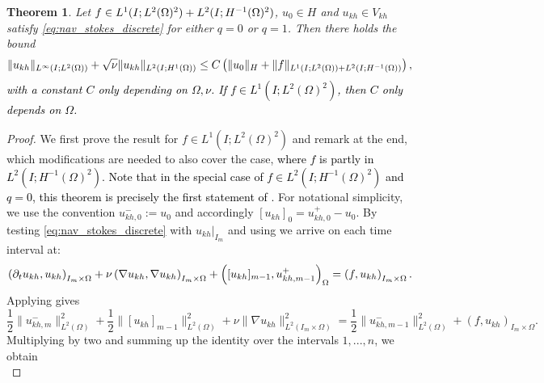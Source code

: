 \documentclass{m2an}
\newcommand\blue[1]{\textcolor{black}{#1}}
\newtheorem{theorem}{Theorem}[section]
\newcommand{\ImOprod}[1]{\left( #1 \right)_{I_m\times\Omega}}
\newcommand{\Oprod}[1]{\left( #1 \right)_{\Omega}}
\newcommand{\Vkh}{V_{kh}}
\newcommand{\ukh}{u_{kh}}
\newcommand{\HmOd}{H^{-1}(\Omega)^2}
\newcommand{\LtwoHone}{L^2(I;H^1(\Omega))}
\newcommand{\LtwomLtwo}{L^2(I_m \times \Omega)}
\begin{document}
\begin{theorem}\label{thm:stability_discrete_navier_stokes}
  Let $f \in L^1(I;L^2(\Omega)^2) + L^2(I;\blue{H^{-1}(\Omega)^2})$, $u_0 \in H$ and $u_{kh} \in \Vkh$ satisfy
  \cref{eq:nav_stokes_discrete} for either $q=0$ or $q=1$. Then there holds the bound
  \begin{equation*}
    \|\ukh\|_{L^\infty(I;L^2(\Omega))} + \blue{\sqrt{\nu}} \|\ukh\|_{\blue{\LtwoHone}} 
    \le C \left(\|u_0\|_H + \|f\|_{L^1(I;L^2(\Omega)) + L^2(I;\blue{H^{-1}(\Omega)})}\right),
  \end{equation*}
  \blue{with a constant $C$ only depending on $\Omega,\nu$. If $f \in L^1(I;L^2(\Omega)^2)$, then 
  $C$ only depends on $\Omega$.}
\end{theorem}
\begin{proof}
  We first prove the result for $f \in L^1(I;L^2(\Omega)^2)$ and remark at the end, 
  which modifications are needed to also cover the case, \blue{where $f$ is partly in $L^2(I;\HmOd)$.}
  \blue{Note that in the special case of $f \in L^2(I;\HmOd)$ and $q=0$, this theorem is precisely the 
  first statement of \cite[Lemma 5.1]{Chrysafinos2010}.}
  For notational simplicity, we use the convention $u_{kh,0}^- := u_0$ and accordingly
  $[\ukh]_0 = u_{kh,0}^+ - u_0$.
  By testing \eqref{eq:nav_stokes_discrete} with $\ukh|_{I_m}$ and using 
  we arrive on each time interval at:
  \begin{equation*}
    \blue{\ImOprod{\partial_t \ukh,\ukh}} + \nu\ImOprod{\nabla \ukh,\nabla \ukh}
    + \Oprod{[\ukh]_{m-1},u_{kh,m-1}^+} = \ImOprod{f,\ukh}.
  \end{equation*}
  Applying  gives
  \begin{equation*}
    \frac{1}{2} \|u_{kh,m}^-\|_{L^2(\Omega)}^2
    + \frac{1}{2} \|[\ukh]_{m-1}\|_{L^2(\Omega)}^2
    + \nu\|\nabla \ukh \|_{\LtwomLtwo}^2
    = \frac{1}{2} \|u_{kh,m-1}^-\|_{L^2(\Omega)}^2
    + \ImOprod{f,\ukh}.
  \end{equation*}
  Multiplying by two and summing up the identity over the intervals $1,...,n$, we obtain
  \begin{equation}\label{eq:nav_stokes_discrete_tested}

\end{equation}
\end{proof}
\end{document}
